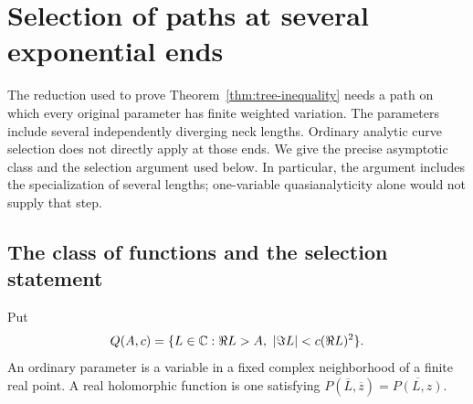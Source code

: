 \section{Selection of paths at several exponential ends}\label{sec:path}

The reduction used to prove Theorem~\ref{thm:tree-inequality} needs a path on
which every original parameter has finite weighted variation.  The parameters
include several independently diverging neck lengths.  Ordinary analytic
curve selection does not directly apply at those ends.  We give the precise
asymptotic class and the selection argument used below.  In particular, the
argument includes the specialization of several lengths; one-variable
quasianalyticity alone would not supply that step.

\subsection{The class of functions and the selection statement}

Put
\[
 Q(A,c)=\{L\in\mathbb{C}:\Re L>A,\ |\Im L|<c(\Re L)^2\}.
\]
An ordinary parameter is a variable in a fixed complex neighborhood of a
finite real point.  A real holomorphic function is one satisfying
\(P(\overline L,\overline z)=\overline{P(L,z)}\).

